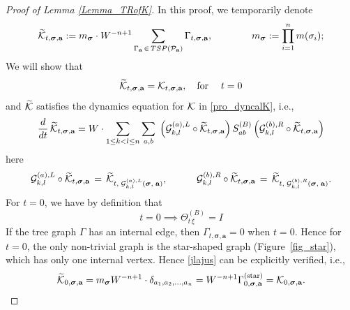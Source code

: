 \documentclass[10pt,reqno]{article}
\theoremstyle{plain} %
\theoremstyle{remark}
\numberwithin{equation}{section}
\begin{document}
\begin{proof}[Proof of Lemma \ref{Lemma_TRofK}]
 In this proof, we temporarily denote 
   $$
   \widetilde{ {\cal K}}_{t, \boldsymbol{\sigma}, \textbf{a}}:= m_{\boldsymbol{\sigma}}\cdot W^{-n+1}    \sum_{\Gamma_{\textbf{a}}\, \in\,  {TSP}({\cal P}_{\textbf{a}})}  \Gamma_{t, \boldsymbol{\sigma}, \textbf{a}},\quad \quad \quad \quad m_{\boldsymbol{\sigma}}:=\prod_{i=1}^n m(\sigma_i);
   $$
   We will show that 
  \begin{equation}\label{jlajus}
     \widetilde{ {\cal K}}_{t, \boldsymbol{\sigma}, \textbf{a}}
   =
    { {\cal K}}_{t, \boldsymbol{\sigma}, \textbf{a}},\quad  \text{for} \; \quad  t=0   \end{equation}
and   $\widetilde{\cal K}$ satisfies the dynamics equation for $ \cal K$ in \eqref{pro_dyncalK}, i.e., 
  \begin{align}\label{pjlacalK}
       \frac{d}{dt}\, \widetilde{ {\cal K}}_{t, \boldsymbol{\sigma}, \textbf{a}} 
       =  
       {W}\cdot  \sum_{1 \le k < l \le n} \sum_{a, b} \; \left( {\cal G}^{(a), L}_{k, l} \circ  \widetilde{ {\cal K}}_{t, \boldsymbol{\sigma}, \textbf{a}} \right) S^{(B)}_{ab} \left( {\cal G}^{(b), R}_{k, l} \circ  \widetilde{ {\cal K}}_{t, \boldsymbol{\sigma}, \textbf{a}} \right)  
    \end{align}
    here
    $$
    {\cal G}^{(a), L}_{k, l} \circ  \widetilde{ {\cal K}}_{t, \boldsymbol{\sigma}, \textbf{a}}  \,=\,\widetilde{ {\cal K}}_{t, \; {\cal G}^{(a), L}_{k, l}\left( \boldsymbol{\sigma}, \; \textbf{a}\right) } ,\quad \quad 
    \quad 
    {\cal G}^{(b), R}_{k, l} \circ  \widetilde{ {\cal K}}_{t, \boldsymbol{\sigma}, \textbf{a}} 
    \,=\,\widetilde{ {\cal K}}_{t, \; {\cal G}^{(b), R}_{k, l}\left( \boldsymbol{\sigma}, \; \textbf{a}\right) }.
    $$
    For  $t = 0$, we have  by definition that 
    $$
    t = 0 \implies \Theta^{(B)}_{t\, \xi} = I 
    $$
    If the tree graph $\Gamma$ has an internal edge,  then $\Gamma_{t, \boldsymbol{\sigma}, \textbf{a}} = 0$ when $t = 0$. Hence for $t=0$, the  only non-trivial graph is the star-shaped graph (Figure~\ref{fig_star}), which has only one internal vertex.
Hence  \eqref{jlajus} can be explicitly verified, i.e., 
$$
 \widetilde{{\cal K}}_{0, \boldsymbol{\sigma}, \textbf{a}} 
  =   m_{\boldsymbol{\sigma}} W^{ -n+1}\cdot\delta_{a_1, a_2, \dots, a_n}  
  = 
   W^{ -n+1}\Gamma^{(\text{star})}_{0, \boldsymbol{\sigma}, \textbf{a}} 
     = {\cal K}_{0, \boldsymbol{\sigma}, \textbf{a}} .
$$


\end{proof}
\end{document}
